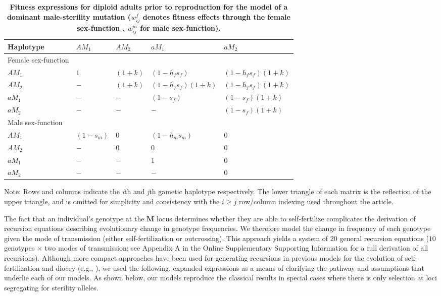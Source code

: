 \documentclass[9pt,twocolumn,twoside,lineno]{gsajnl}
\begin{document}
\begin{table*}[htbp]
\centering
\caption{\bf Fitness expressions for diploid adults prior to reproduction for the model of a dominant male-sterility mutation ($w^f_{ij}$ denotes fitness effects through the female sex-function , $w^m_{ij}$ for male sex-function).}
\begin{tableminipage}{\textwidth}
\begin{tabularx}{\textwidth}{XXXXX}
\hline
Haplotype & $ AM_1$ & $ AM_2$ & $ aM_1$ & $ aM_2$ \\
\hline
Female sex-function & & & & \\
$ AM_1$ & $1$ & $(1 + k)$ & $(1 - h_f s_f)$        & $(1 - h_f s_f)(1 + k)$ \\
$ AM_2$ & $-$ & $(1 + k)$ & $(1 - h_f s_f)(1 + k)$ & $(1 - h_f s_f)(1 + k)$ \\
$ aM_1$ & $-$ & $-$       & $(1 - s_f)$            & $(1 - s_f)(1 + k)$ \\
$ aM_2$ & $-$ & $-$       & $-$                    & $(1 - s_f)(1 + k)$ \\
Male sex-function & & & & \\
$ AM_1$ & $(1 - s_m)$ & $0$ & $(1 - h_m s_m)$ & $0$ \\
$ AM_2$ & $-$         & $0$ & $0$             & $0$ \\
$ aM_1$ & $-$         & $-$ & $1$             & $0$ \\
$ aM_2$ & $-$         & $-$ & $-$             & $0$ \\
\hline
\end{tabularx}
  \label{tab:fitness}
\end{tableminipage}
{\footnotesize Note: Rows and columns indicate the \textit{i}th and \textit{j}th gametic haplotype respectively. The lower triangle of each matrix is the reflection of the upper triangle, and is omitted for simplicity and consistency with the $i \geq j$ row/column indexing used throughout the article.}
\end{table*}


The fact that an individual's genotype at the $\mathbf{M}$ locus determines whether they are able to self-fertilize complicates the derivation of recursion equations describing evolutionary change in genotype frequencies. We therefore model the change in frequency of each genotype given the mode of transmission (either self-fertilization or outcrossing). This approach yields a system of $20$ general recursion equations ($10$ genotypes $\times$ two modes of transmission; see Appendix A in the Online Supplementary Supporting Information for a full derivation of all recursions). Although more compact approaches have been used for generating recursions in previous models for the evolution of self-fertilization and dioecy (e.g., \citealt{Charlesworth1978a,Charlesworth2010}), we used the following, expanded expressions as a means of clarifying the pathway and assumptions that underlie each of our models. As shown below, our models reproduce the classical results in special cases where there is only selection at loci segregating for sterility alleles.
\end{document}
